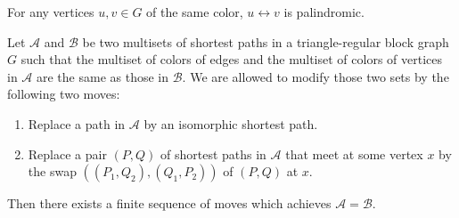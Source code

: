 \documentclass[10pt,a4paper]{amsart}
\newcommand{\cA}{\mathcal{A}}
\begin{document}
\begin{lemma}\label{lemma:symmetry}
    For any vertices $u,v\in G$ of the same color, $u\leftrightarrow
    v$ is palindromic.
\end{lemma}

\begin{theorem}\label{thm:sets-of-paths}
    Let $\mathcal A$ and $\mathcal B$ be two multisets of shortest paths in a triangle-regular block graph $G$ such that the multiset of colors of edges and the multiset of colors of vertices in $\mathcal{A}$ are the same as those in $\mathcal B$. We are allowed to modify those two sets by the following two moves:
    \begin{enumerate}
        \item Replace a path in $\cA$ by an isomorphic shortest path.
        \item Replace a pair $(P,Q)$ of shortest paths in $\cA$ that
	meet at some vertex $x$ by the swap $((P_1,Q_2),(Q_1,P_2))$ of
	$(P,Q)$ at $x$.
    \end{enumerate}
    Then there exists a finite sequence of moves which achieves $\mathcal A=\mathcal B$.
\end{theorem}
\end{document}
